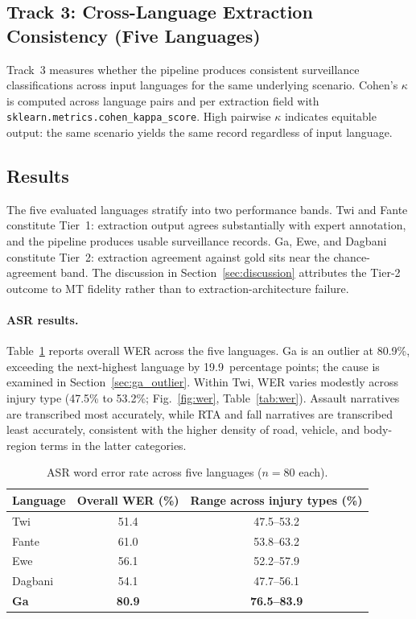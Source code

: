 \documentclass[conference]{IEEEtran}
\begin{document}
\subsection{Track 3: Cross-Language Extraction Consistency (Five Languages)}

Track~3 measures whether the pipeline produces consistent
surveillance classifications across input languages for the same
underlying scenario. Cohen's $\kappa$ is computed across language
pairs and per extraction field with
\texttt{sklearn.metrics.cohen\_kappa\_score}. High pairwise $\kappa$
indicates equitable output: the same scenario yields the same record
regardless of input language.

\subsection{Results}

The five evaluated languages stratify into two performance bands.
Twi and Fante constitute Tier~1: extraction output agrees
substantially with expert annotation, and the pipeline produces
usable surveillance records. Ga, Ewe, and Dagbani constitute
Tier~2: extraction agreement against gold sits near the
chance-agreement band. The discussion in
Section~\ref{sec:discussion} attributes the Tier-2 outcome to MT
fidelity rather than to extraction-architecture failure.

\paragraph{ASR results.}
Table~\ref{tab:wer_all} reports overall WER across the five
languages. Ga is an outlier at 80.9\%, exceeding the next-highest
language by 19.9~percentage points; the cause is examined in
Section~\ref{sec:ga_outlier}. Within Twi, WER varies modestly across
injury type (47.5\% to 53.2\%; Fig.~\ref{fig:wer},
Table~\ref{tab:wer}). Assault narratives are transcribed most
accurately, while RTA and fall narratives are transcribed least
accurately, consistent with the higher density of road, vehicle, and
body-region terms in the latter categories.

\begin{table}[!t]
\caption{ASR word error rate across five languages ($n = 80$ each).}
\label{tab:wer_all}
\centering
\begin{tabular}{lcc}
\toprule
\textbf{Language} & \textbf{Overall WER (\%)}
                  & \textbf{Range across injury types (\%)} \\
\midrule
Twi              & 51.4 & 47.5--53.2 \\
Fante            & 61.0 & 53.8--63.2 \\
Ewe              & 56.1 & 52.2--57.9 \\
Dagbani          & 54.1 & 47.7--56.1 \\
\textbf{Ga}      & \textbf{80.9} & \textbf{76.5--83.9} \\
\bottomrule
\end{tabular}
\end{table}
\end{document}
